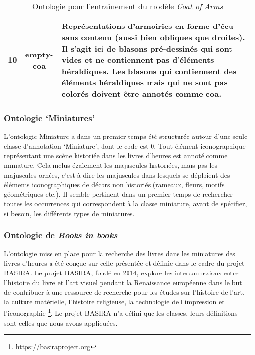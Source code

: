 \documentclass[12pt,twoside]{book}
\begin{document}
\begin{center}
\begin{table}
\begin{tabular}{|c|c|p{12cm}|}
    \hline
    10 & empty-coa & Représentations d'armoiries en forme d'écu sans contenu (aussi bien obliques que droites). Il s'agit ici de blasons pré-dessinés qui sont vides et ne contiennent pas d'éléments héraldiques. Les blasons qui contiennent des éléments héraldiques mais qui ne sont pas colorés doivent être annotés comme coa. \\ 
    \hline
\end{tabular}
\caption{Ontologie pour l'entraînement du modèle \textit{Coat of Arms}}
\end{table}
\end{center}

\newpage
\subsubsection{Ontologie ‘Miniatures’}

L’ontologie Miniature a dans un premier temps été structurée autour d’une seule classe d’annotation ‘Miniature’, dont le code est 0. Tout élément iconographique représentant une scène historiée dans les livres d’heures est annoté comme miniature. Cela inclus également les majuscules historiées, mais pas les majuscules ornées, c’est-à-dire les majuscules dans lesquels se déploient des éléments iconographiques de décors non historiés (rameaux, fleurs, motifs géométriques etc.). Il semble pertinent dans un premier temps de rechercher toutes les occurrences qui correspondent à la classe miniature, avant de spécifier, si besoin, les différents types de miniatures.   

\subsubsection{Ontologie de \textit{Books in books}}

L'ontologie mise en place pour la recherche des livres dans les miniatures des livres d’heures a été conçue sur celle présentée et définie dans le cadre du projet BASIRA. Le projet BASIRA, fondé en 2014, explore les interconnexions entre l'histoire du livre et l'art visuel pendant la Renaissance européenne dans le but de contribuer à une ressource de recherche pour les études sur l'histoire de l'art, la culture matérielle, l'histoire religieuse, la technologie de l'impression et l'iconographie \footnote{\url{https://basiraproject.org}}. Le projet BASIRA n’a défini que les classes, leurs définitions sont celles que nous avons appliquées. 

\newpage
\end{document}
